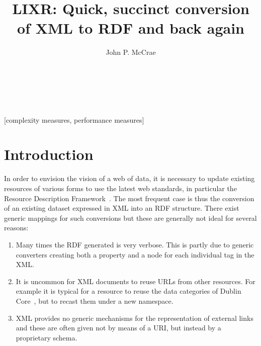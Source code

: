 \documentclass{acm_proc_article-sp}
\begin{document}
\title{LIXR: Quick, succinct conversion of XML to RDF and back again}


\author{
\alignauthor
John P. McCrae\\
       \\
       \\
       \\
}

\maketitle
\begin{abstract}
\end{abstract}

[complexity measures, performance measures]



\section{Introduction}

In order to envision the vision of a web of data, it is necessary to update existing 
resources of various forms to use the latest web standards, in particular the 
Resource Description Framework~\cite[RDF]{}. The most frequent case is thus the
conversion of an existing dataset expressed in XML into an RDF structure. There
exist generic mappings for such conversions but these are generally not ideal for
several reasons:

\begin{enumerate}
\item Many times the RDF generated is very verbose. This is partly due to generic
converters creating both a property and a node for each individual tag in the XML.
\item It is uncommon for XML documents to reuse URLs from other resources. For
example it is typical for a resource to reuse the data categories of Dublin Core~\cite{}, 
but to recast them under a new namespace.
\item XML provides no generic mechanisms for the representation of external links
and these are often given not by means of a URI, but instead by a proprietary schema.
\end{enumerate}
\end{document}
